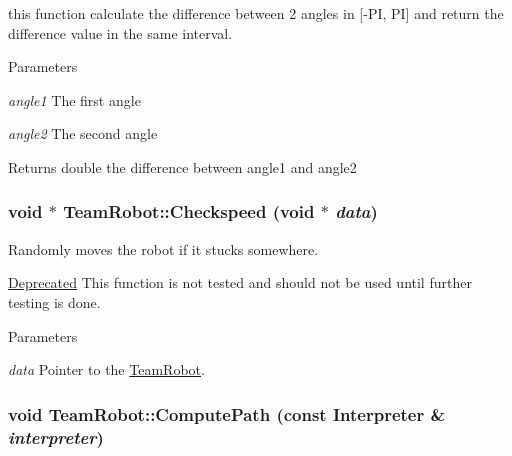 this function calculate the difference between 2 angles in \mbox{[}-\/PI, PI\mbox{]} and return the difference value in the same interval. 


\begin{DoxyParams}{Parameters}
\item[{\em angle1}]The first angle \item[{\em angle2}]The second angle \end{DoxyParams}
\begin{DoxyReturn}{Returns}
double the difference between angle1 and angle2 
\end{DoxyReturn}
\hypertarget{classTeamRobot_ac52f7f240fde40db09116e8639a53c21}{
\subsubsection[{Checkspeed}]{\setlength{\rightskip}{0pt plus 5cm}void $\ast$ TeamRobot::Checkspeed (void $\ast$ {\em data})}}
\label{classTeamRobot_ac52f7f240fde40db09116e8639a53c21}


Randomly moves the robot if it stucks somewhere. 

\begin{Desc}
\item[\hyperlink{deprecated__deprecated000004}{Deprecated}]This function is not tested and should not be used until further testing is done. \end{Desc}

\begin{DoxyParams}{Parameters}
\item[{\em data}]Pointer to the \hyperlink{classTeamRobot}{TeamRobot}. \end{DoxyParams}
\hypertarget{classTeamRobot_a9ae431d9eeaa1d16fa28c636499ab553}{
\subsubsection[{ComputePath}]{\setlength{\rightskip}{0pt plus 5cm}void TeamRobot::ComputePath (const {\bf Interpreter} \& {\em interpreter})}}
\label{classTeamRobot_a9ae431d9eeaa1d16fa28c636499ab553}


